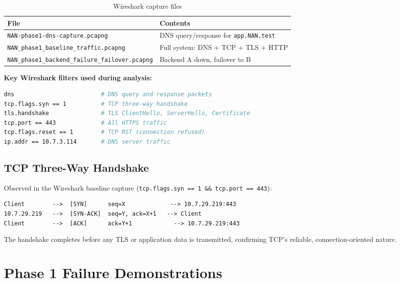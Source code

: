 \documentclass[12pt,a4paper]{article}
\begin{document}
\begin{table}[h!]
\centering
\caption{Wireshark capture files}
\begin{tabular}{ll}
\toprule
\textbf{File} & \textbf{Contents} \\
\midrule
\texttt{NAN-phase1-dns-capture.pcapng} & DNS query/response for \texttt{app.NAN.test} \\
\texttt{NAN\_phase1\_baseline\_traffic.pcapng} & Full system: DNS + TCP + TLS + HTTP \\
\texttt{NAN\_phase1\_backend\_failure\_failover.pcapng} & Backend A down, failover to B \\
\bottomrule
\end{tabular}
\end{table}

\textbf{Key Wireshark filters used during analysis:}

\begin{lstlisting}[language=bash]
dns                         # DNS query and response packets
tcp.flags.syn == 1          # TCP three-way handshake
tls.handshake               # TLS ClientHello, ServerHello, Certificate
tcp.port == 443             # All HTTPS traffic
tcp.flags.reset == 1        # TCP RST (connection refused)
ip.addr == 10.7.3.114       # DNS server traffic
\end{lstlisting}

\subsection{TCP Three-Way Handshake}

Observed in the Wireshark baseline capture (\texttt{tcp.flags.syn == 1 \&\& tcp.port == 443}):

\begin{lstlisting}
Client        -->  [SYN]      seq=X             --> 10.7.29.219:443
10.7.29.219   -->  [SYN-ACK]  seq=Y, ack=X+1   --> Client
Client        -->  [ACK]      ack=Y+1            --> 10.7.29.219:443
\end{lstlisting}

The handshake completes before any TLS or application data is transmitted, confirming TCP's reliable, connection-oriented nature.

\section{Phase 1 Failure Demonstrations}
\end{document}
